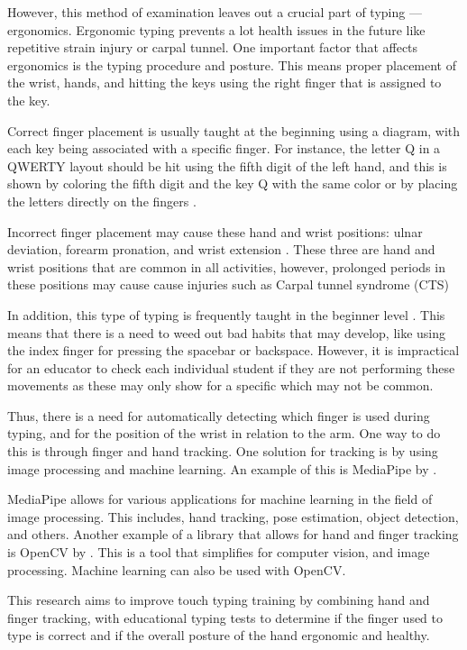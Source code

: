 \documentclass{report}
\begin{document}
However, this method of examination leaves out a crucial part of typing —
ergonomics. Ergonomic typing prevents a lot health issues in the future like
repetitive strain injury or carpal tunnel. One important factor that affects
ergonomics is the typing procedure and posture. This means proper placement of
the wrist, hands, and hitting the keys using the right finger that is assigned
to the key.

Correct finger placement is usually taught at the beginning using a diagram,
with each key being associated with a specific finger. For instance, the letter
Q in a QWERTY layout should be hit using the fifth digit of the left hand, and
this is shown by coloring the fifth digit and the key Q with the same color or
by placing the letters directly on the fingers \parencite{dobson2009touch}.

Incorrect finger placement may cause these hand and wrist positions: ulnar
deviation, forearm pronation, and wrist extension \parencite{serina1999}. These
three are hand and wrist positions that are common in all activities, however,
prolonged periods in these positions may cause cause injuries such as Carpal
tunnel syndrome (CTS) \parencite{toosi2015}

In addition, this type of typing is frequently taught in the beginner level
\parencite{donica2018}. This means that there is a need to weed out bad habits
that may develop, like using the index finger for pressing the spacebar or
backspace. However, it is impractical for an educator to check each individual
student if they are not performing these movements as these may only show for a
specific which may not be common.

Thus, there is a need for automatically detecting which finger is used during
typing, and for the position of the wrist in relation to the arm. One way to do
this is through finger and hand tracking. One solution for tracking is by using
image processing and machine learning. An example of this is MediaPipe by
\cite{mediapipe}.

MediaPipe allows for various applications for machine learning in the field of
image processing. This includes, hand tracking, pose estimation, object
detection, and others. Another example of a library that allows for hand and
finger tracking is OpenCV by \cite{opencv}. This is a tool that simplifies for
computer vision, and image processing. Machine learning can also be used with
OpenCV.

This research aims to improve touch typing training by combining hand and finger
tracking, with educational typing tests to determine if the finger used to type
is correct and if the overall posture of the hand ergonomic and healthy.
\end{document}
